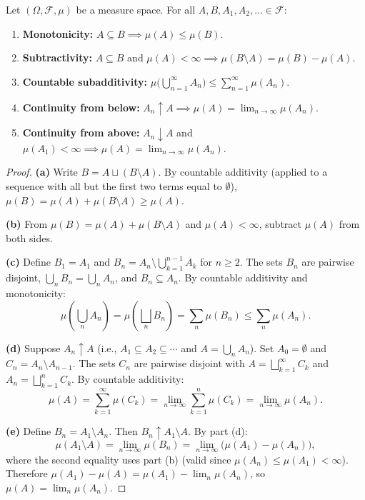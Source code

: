 \documentclass[11pt,a4paper]{article}
\begin{document}
\begin{theorem}
\label{thm:measure_props}
Let $(\Omega, \mathcal{F}, \mu)$ be a measure space. For all
$A, B, A_1, A_2, \ldots \in \mathcal{F}$:
\begin{enumerate}[nosep,label=(\alph*)]
  \item \textbf{Monotonicity:}
    $A \subseteq B \implies \mu(A) \leq \mu(B)$.
  \item \textbf{Subtractivity:}
    $A \subseteq B$ and $\mu(A) < \infty \implies
    \mu(B \setminus A) = \mu(B) - \mu(A)$.
  \item \textbf{Countable subadditivity:}
    $\mu\bigl(\bigcup_{n=1}^\infty A_n\bigr) \leq
    \sum_{n=1}^\infty \mu(A_n)$.
  \item \textbf{Continuity from below:}
    $A_n \uparrow A \implies \mu(A) = \lim_{n \to \infty} \mu(A_n)$.
  \item \textbf{Continuity from above:}
    $A_n \downarrow A$ and $\mu(A_1) < \infty \implies
    \mu(A) = \lim_{n \to \infty} \mu(A_n)$.
\end{enumerate}
\end{theorem}

\begin{proof}
\textbf{(a)} Write $B = A \sqcup (B \setminus A)$. By countable
additivity (applied to a sequence with all but the first two terms
equal to $\emptyset$), $\mu(B) = \mu(A) + \mu(B \setminus A) \geq
\mu(A)$.

\textbf{(b)} From $\mu(B) = \mu(A) + \mu(B \setminus A)$ and
$\mu(A) < \infty$, subtract $\mu(A)$ from both sides.

\textbf{(c)} Define $B_1 = A_1$ and
$B_n = A_n \setminus \bigcup_{k=1}^{n-1} A_k$ for $n \geq 2$. The
sets $B_n$ are pairwise disjoint, $\bigcup_n B_n = \bigcup_n A_n$,
and $B_n \subseteq A_n$. By countable additivity and monotonicity:
\begin{equation}
  \mu\!\left(\bigcup_n A_n\right)
    = \mu\!\left(\bigsqcup_n B_n\right)
    = \sum_n \mu(B_n) \leq \sum_n \mu(A_n).
\end{equation}

\textbf{(d)} Suppose $A_n \uparrow A$ (i.e.,
$A_1 \subseteq A_2 \subseteq \cdots$ and
$A = \bigcup_n A_n$). Set $A_0 = \emptyset$ and
$C_n = A_n \setminus A_{n-1}$. The sets $C_n$ are pairwise disjoint
with $A = \bigsqcup_{k=1}^\infty C_k$ and
$A_n = \bigsqcup_{k=1}^n C_k$. By countable additivity:
\begin{equation}
  \mu(A) = \sum_{k=1}^\infty \mu(C_k)
    = \lim_{n \to \infty} \sum_{k=1}^n \mu(C_k)
    = \lim_{n \to \infty} \mu(A_n).
\end{equation}

\textbf{(e)} Define $B_n = A_1 \setminus A_n$. Then
$B_n \uparrow A_1 \setminus A$. By part (d):
\begin{equation}
  \mu(A_1 \setminus A) = \lim_{n \to \infty} \mu(B_n)
    = \lim_{n \to \infty} \bigl(\mu(A_1) - \mu(A_n)\bigr),
\end{equation}
where the second equality uses part (b) (valid since
$\mu(A_n) \leq \mu(A_1) < \infty$). Therefore
$\mu(A_1) - \mu(A) = \mu(A_1) - \lim_n \mu(A_n)$, so
$\mu(A) = \lim_n \mu(A_n)$.
\end{proof}
\end{document}
